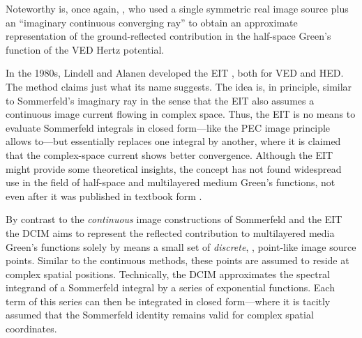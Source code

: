 Noteworthy is, once again, \textcite[250]{Sommerfeld1964}, who used a single
symmetric real image source plus an \enquote{imaginary continuous converging
ray} to obtain an approximate representation of the ground-reflected
contribution in the half-space Green's function of the \ac{VED} Hertz potential.

In the 1980s, Lindell and Alanen developed the \ac{EIT} 
\cite{Lindell1984,Lindell1984a,Lindell1984b}, both for \ac{VED} and \ac{HED}.
The method claims just what its name suggests.
The idea is, in principle, similar to Sommerfeld's imaginary ray in the sense
that the \ac{EIT} also assumes a continuous image current flowing in complex
space.
Thus, the \ac{EIT} is no means to evaluate Sommerfeld integrals in closed
form---like the \ac{PEC} image principle allows to---but essentially
replaces one integral by another, where it is claimed that the complex-space
current shows better convergence.
Although the \ac{EIT} might provide some theoretical insights, the concept
has not found widespread use in the field of half-space and multilayered medium 
Green's functions, not even after it was published in textbook form
\cite{Lindell2000}.

By contrast to the \emph{continuous} image constructions of Sommerfeld and the
\ac{EIT} the \ac{DCIM} aims to represent the reflected contribution to
multilayered media Green's functions solely by means a small set
of \emph{discrete}, \ie, point-like image source points.
Similar to the continuous methods, these points are assumed to reside 
at complex spatial positions.
Technically, the \ac{DCIM} approximates the spectral integrand of a Sommerfeld
integral by a series of exponential functions.
Each term of this series can then be integrated in closed form---where it is
tacitly assumed that the Sommerfeld identity remains valid for complex spatial
coordinates.


